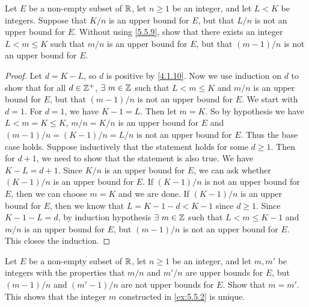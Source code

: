 \begin{ex}\label{ex:5.5.2}
  Let \(E\) be a non-empty subset of \(\mathbb{R}\), let \(n \geq 1\) be an integer, and let \(L < K\) be integers.
  Suppose that \(K / n\) is an upper bound for \(E\), but that \(L / n\) is not an upper bound for \(E\).
  Without using \cref{5.5.9}, show that there exists an integer \(L < m \leq K\) such that \(m / n\) is an upper bound for \(E\), but that \((m - 1) / n\) is not an upper bound for \(E\).
\end{ex}

\begin{proof}
  Let \(d = K - L\), so \(d\) is positive by \cref{4.1.10}.
  Now we use induction on \(d\) to show that for all \(d \in \mathbb{Z}^+\), \(\exists\ m \in \mathbb{Z}\) such that \(L < m \leq K\) and \(m / n\) is an upper bound for \(E\), but that \((m - 1) / n\) is not an upper bound for \(E\).
  We start with \(d = 1\).
  For \(d = 1\), we have \(K - 1 = L\).
  Then let \(m = K\).
  So by hypothesis we have \(L < m = K \leq K\), \(m / n = K / n\) is an upper bound for \(E\) and \((m - 1) / n = (K - 1) / n = L / n\) is not an upper bound for \(E\).
  Thus the base case holds.
  Suppose inductively that the statement holds for some \(d \geq 1\).
  Then for \(d + 1\), we need to show that the statement is also true.
  We have \(K - L = d + 1\).
  Since \(K / n\) is an upper bound for \(E\), we can ask whether \((K - 1) / n\) is an upper bound for \(E\).
  If \((K - 1) / n\) is not an upper bound for \(E\), then we can choose \(m = K\) and we are done.
  If \((K - 1) / n\) is an upper bound for \(E\), then we know that \(L = K - 1 - d < K - 1\) since \(d \geq 1\).
  Since \(K - 1 - L = d\), by induction hypothesis \(\exists\ m \in \mathbb{Z}\) such that \(L < m \leq K - 1\) and \(m / n\) is an upper bound for \(E\), but \((m - 1) / n\) is not an upper bound for \(E\).
  This closes the induction.
\end{proof}

\begin{ex}\label{ex:5.5.3}
  Let \(E\) be a non-empty subset of \(\mathbb{R}\), let \(n \geq 1\) be an integer, and let \(m, m'\) be integers with the properties that \(m / n\) and \(m' / n\) are upper bounds for \(E\), but \((m - 1) / n\) and \((m' - 1) / n\) are not upper bounds for \(E\).
  Show that \(m = m'\).
  This shows that the integer \(m\) constructed in \cref{ex:5.5.2} is unique.
\end{ex}

